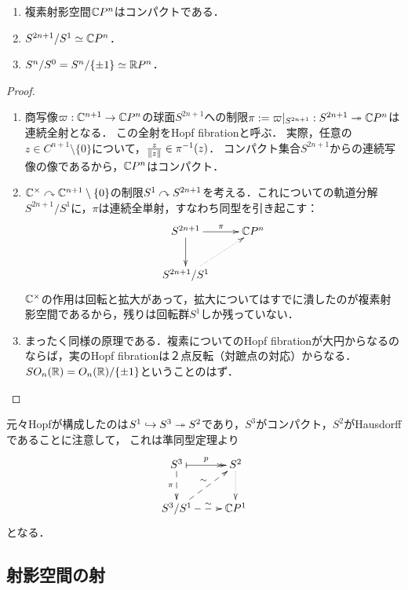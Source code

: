 \documentclass[uplatex,dvipdfmx]{jsreport}
\begin{document}
\begin{proposition}\mbox{}
    \begin{enumerate}
        \item 複素射影空間$\mathbb{C} P^n$はコンパクトである．
        \item $S^{2n+1}/S^1\simeq\mathbb{C} P^n$．
        \item $S^n/S^0=S^n/\{\pm 1\}\simeq\mathbb{R} P^n$．
    \end{enumerate}
\end{proposition}
\begin{proof}\mbox{}
    \begin{enumerate}
        \item 商写像$\varpi:\mathbb{C}^{n+1}\to\mathbb{C} P^n$の球面$S^{2n+1}$への制限$\pi:=\varpi|_{S^{2n+1}}:S^{2n+1}\twoheadrightarrow\mathbb{C} P^n$は連続全射となる．
        この全射をHopf fibrationと呼ぶ．
        実際，任意の$z\in C^{n+1}\setminus\{0\}$について，$\frac{z}{\|z\|}\in\pi^{-1}(z)$．
        コンパクト集合$S^{2n+1}$からの連続写像の像であるから，$\mathbb{C} P^n$はコンパクト．
        \item 
        $\mathbb{C}^\times\curvearrowright\mathbb{C}^{n+1}\setminus\{0\}$の制限$S^1\curvearrowright S^{2n+1}$を考える．これについての軌道分解$S^{2n+1}/S^1$に，$\pi$は連続全単射，すなわち同型を引き起こす：
        \[\xymatrix{
            S^{2n+1}\ar[r]^-{\pi}\ar[d]&\C P^n\\
            S^{2n+1}/S^1\ar@{.>}[ur]
        }\]
        $\mathbb{C}^\times$の作用は回転と拡大があって，拡大についてはすでに潰したのが複素射影空間であるから，残りは回転群$S^1$しか残っていない．
        \item まったく同様の原理である．複素についてのHopf fibrationが大円からなるのならば，実のHopf fibrationは２点反転（対蹠点の対応）からなる．
        $SO_n(\mathbb{R})=O_n(\mathbb{R})/\{\pm 1\}$ということのはず．
    \end{enumerate}
\end{proof}
\begin{remark}
    元々Hopfが構成したのは$S^1\hookrightarrow S^3\twoheadrightarrow S^2$であり，$S^3$がコンパクト，$S^2$がHausdorffであることに注意して，
    これは準同型定理より
    \[\xymatrix{
        S^3\ar@{|->>}[r]^-p\ar@{-->}[d]_-{\pi}&S^2\ar@{.>}[d]\\
        S^3/S^1\ar@{-->}[ur]^-{\sim}\ar@{-->}[r]^-{\sim}&\C P^1
    }\]
    となる．
\end{remark}

\subsection{射影空間の射}
\end{document}
